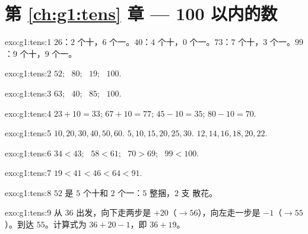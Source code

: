 \section*{第 \ref{ch:g1:tens} 章 --- 100 以内的数}

\begin{solution}{exo:g1:tens:1}
$26$：$2$ 个十，$6$ 个一。$40$：$4$ 个十，$0$ 个一。$73$：$7$
个十，$3$ 个一。$99$：$9$ 个十，$9$ 个一。
\end{solution}

\begin{solution}{exo:g1:tens:2}
$52$; \ $80$; \ $19$; \ $100$.
\end{solution}

\begin{solution}{exo:g1:tens:3}
$63$; \ $40$; \ $85$; \ $100$.
\end{solution}

\begin{solution}{exo:g1:tens:4}
$23 + 10 = 33$; \quad $67 + 10 = 77$; \quad $45 - 10 = 35$; \quad
$80 - 10 = 70$.
\end{solution}

\begin{solution}{exo:g1:tens:5}
$10, 20, 30, 40, 50, 60$. \quad $5, 10, 15, 20, 25, 30$. \quad
$12, 14, 16, 18, 20, 22$.
\end{solution}

\begin{solution}{exo:g1:tens:6}
$34 < 43$; \ $58 < 61$; \ $70 > 69$; \ $99 < 100$.
\end{solution}

\begin{solution}{exo:g1:tens:7}
$19 < 41 < 46 < 64 < 91$.
\end{solution}

\begin{solution}{exo:g1:tens:8}
$52$ 是 $5$ 个十和 $2$ 个一：$5$ 整捆，$2$ 支
散花。
\end{solution}

\begin{solution}{exo:g1:tens:9}
从 $36$ 出发，向下走两步是 $+20$（$\to 56$），向左走一步是
$-1$（$\to 55$）。到达 $55$。计算式为
$36 + 20 - 1$，即 $36 + 19$。
\end{solution}
